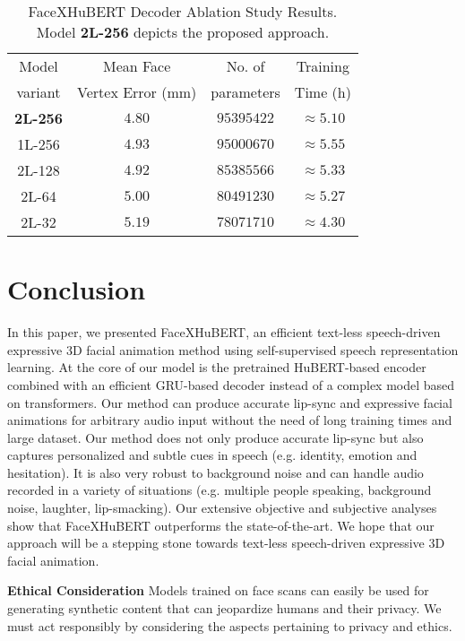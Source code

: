 \documentclass[10pt,twocolumn,letterpaper]{article}
\begin{document}
\begingroup
\setlength{\tabcolsep}{4pt} \renewcommand{\arraystretch}{0.6} \begin{table}[t]
  \centering
  \begin{tabular}{c c c c}
    \toprule
    Model & Mean Face  & No. of  & Training\\
    variant & Vertex Error (mm) & parameters & Time (h)\\
    \midrule
    \textbf{2L-256} & $\mathbf{4.80}$ & $95395422$ & $\approx5.10$\\
    1L-256 & $4.93$ & $95000670$ & $\approx5.55$\\
    2L-128 & $4.92$ & $85385566$ & $\approx5.33$\\
    2L-64 & $5.00$ & $80491230$ & $\approx5.27$\\
    2L-32 & $5.19$ & $78071710$ & $\approx4.30$\\
    \bottomrule
\end{tabular}
  \caption{FaceXHuBERT Decoder Ablation Study Results. Model \textbf{2L-256} depicts the proposed approach.}
  \label{tab:GRU_ablation}
  \vspace{-1em}
\end{table}
\endgroup


\section{Conclusion}

In this paper, we presented FaceXHuBERT, an efficient text-less speech-driven expressive 3D facial animation method using self-supervised speech representation learning. At the core of our model is the pretrained HuBERT-based encoder combined with an efficient GRU-based decoder instead of a complex model based on transformers. Our method can produce accurate lip-sync and expressive facial animations for arbitrary audio input without the need of long training times and large dataset. Our method does not only produce accurate lip-sync but also captures personalized and subtle cues in speech (e.g. identity, emotion and hesitation). It is also very robust to background noise and can handle audio recorded in a variety of situations (e.g. multiple people speaking, background noise, laughter, lip-smacking). Our extensive objective and subjective analyses show that FaceXHuBERT outperforms the state-of-the-art. We hope that our approach will be a stepping stone towards text-less speech-driven expressive 3D facial animation.


\noindent\textbf{Ethical Consideration} Models trained on face scans can easily be used for generating synthetic content that can jeopardize humans and their privacy. We must act responsibly by considering the aspects pertaining to privacy and ethics.
\end{document}
